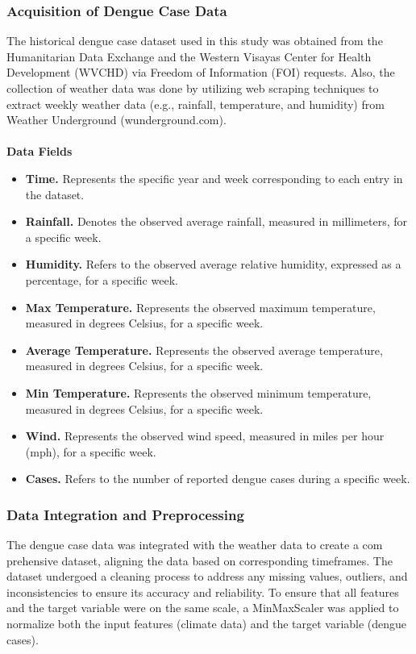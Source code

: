 \subsubsection{Acquisition of Dengue Case Data}
The historical dengue case dataset used in this study was obtained from the Humanitarian Data Exchange and the Western Visayas Center for Health Development (WVCHD) via Freedom of Information (FOI) requests. Also, the collection of weather data was done by utilizing web scraping techniques to extract weekly weather data (e.g., rainfall, temperature, and humidity) from Weather Underground (wunderground.com).
\\
\\
\textbf{Data Fields}
\begin{itemize}
	\item \textbf{Time.} Represents the specific year and week corresponding to each entry in the dataset.
	\item \textbf{Rainfall.} Denotes the observed average rainfall, measured in millimeters, for a specific week.
	\item \textbf{Humidity.} Refers to the observed average relative humidity, expressed as a percentage, for a specific week.    
	\item \textbf{Max Temperature.} Represents the observed maximum temperature, measured in degrees Celsius, for a specific week.
	\item \textbf{Average Temperature.} Represents the observed average temperature, measured in degrees Celsius, for a specific week.
	\item \textbf{Min Temperature.} Represents the observed minimum temperature, measured in degrees Celsius, for a specific week.
	\item \textbf{Wind.} Represents the observed wind speed, measured in miles per hour (mph), for a specific week.
	\item \textbf{Cases.} Refers to the number of reported dengue cases during a specific week.
\end{itemize} 

\subsubsection{Data Integration and Preprocessing}
The dengue case data was integrated with the weather data to create a com
prehensive dataset, aligning the data based on corresponding timeframes. The
dataset undergoed a cleaning process to address any missing values, outliers,
and inconsistencies to ensure its accuracy and reliability. To ensure that all
features and the target variable were on the same scale, a MinMaxScaler was
applied to normalize both the input features (climate data)
and the target variable (dengue cases).

